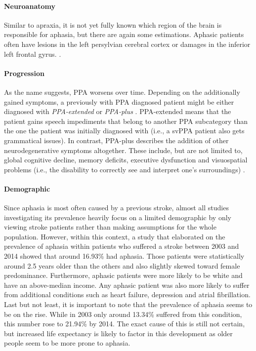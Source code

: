 \documentclass[draft,final]{vutinfth} %
\begin{document}
\paragraph{Neuroanatomy} Similar to apraxia, it is not yet fully known which region of the brain is responsible for aphasia, but there are again some estimations. Aphasic patients often have lesions in the left persylvian cerebral cortex or damages in the inferior left frontal gyrus. \cite{clark2003aphasia}.

\paragraph{Progression} As the name suggests, PPA worsens over time. Depending on the additionally gained symptoms, a previously with PPA diagnosed patient might be either diagnosed with \emph{PPA-extended} or \emph{PPA-plus} \cite{ulugut2022natural}. PPA-extended means that the patient gains speech impediments that belong to another PPA subcategory than the one the patient was initially diagnosed with (i.e., a svPPA patient also gets grammatical issues). In contrast, PPA-plus describes the addition of other neurodegenerative symptoms altogether. These include, but are not limited to, global cognitive decline, memory deficits, executive dysfunction and visuospatial problems (i.e., the disability to correctly see and interpret one's surroundings) \cite{ulugut2022natural}.

\paragraph{Demographic} Since aphasia is most often caused by a previous stroke, almost all studies investigating its prevalence heavily focus on a limited demographic by only viewing stroke patients rather than making assumptions for the whole population. However, within this context, a study that elaborated on the prevalence of aphasia within patients who suffered a stroke between 2003 and 2014 \cite{wu2020prevalence} showed that around 16.93\% had aphasia. Those patients were statistically around 2.5 years older than the others and also slightly skewed toward female predominance. Furthermore, aphasic patients were more likely to be white and have an above-median income. Any aphasic patient was also more likely to suffer from additional conditions such as heart failure, depression and atrial fibrillation. \\
Last but not least, it is important to note that the prevalence of aphasia seems to be on the rise. While in 2003 only around 13.34\% suffered from this condition, this number rose to 21.94\% by 2014. The exact cause of this is still not certain, but increased life expectancy is likely to factor in this development as older people seem to be more prone to aphasia.
\end{document}
